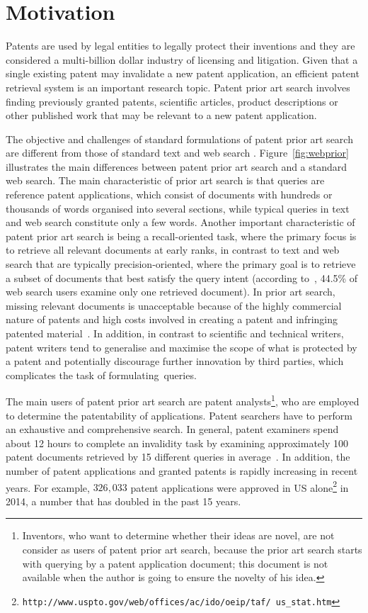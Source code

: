 \section{Motivation}
\label{sec:Motivation}
Patents are used by legal entities to legally protect their inventions and they are considered a multi-billion dollar industry of licensing and litigation. Given that a single existing patent may invalidate a new patent application, an efficient patent retrieval system is an important research topic. 
Patent prior art search involves finding previously granted patents, scientific articles, product
descriptions or other published work that may be relevant to a new patent application. 

The objective and challenges of standard formulations of patent prior art
search are different from those of standard text and web search \citep{magdy2012toward}.
Figure~\ref{fig:webprior} illustrates the main differences between 
patent prior art search and a standard web search.
The main characteristic of prior art search is that queries are reference patent
applications, which consist of documents with hundreds or thousands of
words organised into several sections, while typical queries in text
and web search constitute only a few words. 
Another important characteristic of patent prior art
search is being a recall-oriented task, where the primary focus is to
retrieve all relevant documents at early ranks, in contrast to text
and web search that are typically precision-oriented, where the primary goal is
to retrieve a subset of documents that best satisfy the query
intent (according to~\citep{zhang2010search}, 44.5\% of web search users examine only one retrieved document). 
In prior art search, missing relevant documents is unacceptable because of the highly commercial nature of patents and high costs involved
in creating a patent and infringing patented material~\citep{joho2010survey}. 
In addition, in contrast to scientific and technical writers, patent writers
tend to generalise and maximise the scope of what is protected by a
patent and potentially discourage further innovation by third parties,
which complicates the task of formulating~queries. 

The main users of patent prior art search are 
patent analysts\footnote{Inventors, who want to determine whether their ideas are novel, 
are not consider as users of patent prior art search, because the prior art search starts with querying by a patent application document; this document is not available when  the author is going to ensure the novelty of his idea.}, 
who are employed to determine the patentability 
of applications. 
Patent searchers have to perform an exhaustive and comprehensive search. In general, patent
examiners spend about 12 hours to complete an invalidity task by examining
approximately 100 patent documents retrieved by 15 different queries in average~\citep{joho2010survey}. 
In addition, the number of patent applications and granted patents is rapidly increasing in recent years. For example, $326,033$ patent applications were approved in US alone\footnote{\texttt{http://www.uspto.gov/web/offices/ac/ido/oeip/taf/ us\_stat.htm}} in 2014, a number that has doubled in the past 15 years.

